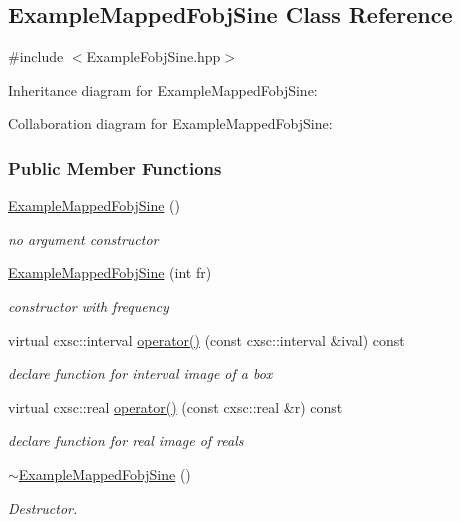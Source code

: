 \hypertarget{classExampleMappedFobjSine}{\subsection{\-Example\-Mapped\-Fobj\-Sine \-Class \-Reference}
\label{classExampleMappedFobjSine}
}


{\ttfamily \#include $<$\-Example\-Fobj\-Sine.\-hpp$>$}



\-Inheritance diagram for \-Example\-Mapped\-Fobj\-Sine\-:


\-Collaboration diagram for \-Example\-Mapped\-Fobj\-Sine\-:
\subsubsection*{\-Public \-Member \-Functions}
\begin{DoxyCompactItemize}
\item 
\hyperlink{classExampleMappedFobjSine_a7dcaa89bf1aca07501d60bea49492f85}{\-Example\-Mapped\-Fobj\-Sine} ()
\begin{DoxyCompactList}\small\item\em no argument constructor \end{DoxyCompactList}\item 
\hyperlink{classExampleMappedFobjSine_ae061e66902679de54e3e18ca5fa111e4}{\-Example\-Mapped\-Fobj\-Sine} (int fr)
\begin{DoxyCompactList}\small\item\em constructor with frequency \end{DoxyCompactList}\item 
virtual cxsc\-::interval \hyperlink{classExampleMappedFobjSine_a6691052e40549a80b4b2e0aa30c34973}{operator()} (const cxsc\-::interval \&ival) const 
\begin{DoxyCompactList}\small\item\em declare function for interval image of a box \end{DoxyCompactList}\item 
virtual cxsc\-::real \hyperlink{classExampleMappedFobjSine_a32ed632df43415e86c556e97a4c02b2f}{operator()} (const cxsc\-::real \&r) const 
\begin{DoxyCompactList}\small\item\em declare function for real image of reals \end{DoxyCompactList}\item 
\hyperlink{classExampleMappedFobjSine_ae0368b75451c033d079d87aed56315ea}{$\sim$\-Example\-Mapped\-Fobj\-Sine} ()
\begin{DoxyCompactList}\small\item\em \-Destructor. \end{DoxyCompactList}\end{DoxyCompactItemize}
